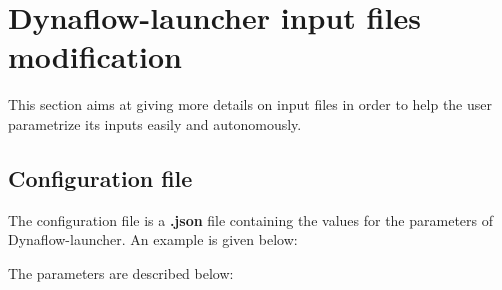 \documentclass[a4paper, 12pt]{report}
\begin{document}
\section[Dynaflow-launcher input files modification]{Dynaflow-launcher input files modification}

This section aims at giving more details on input files in order to help the user parametrize its inputs easily and autonomously.

\subsection{Configuration file}
\label{Dynaflow_Launcher_Configuration_Configuration_File}

The configuration file is a \textbf{.json} file containing the values for the parameters of Dynaflow-launcher. An example is given below:



The parameters are described below:
\end{document}
